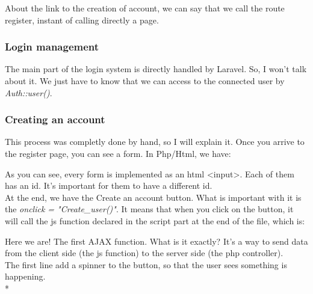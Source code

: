 \documentclass[12pt,a4paper,openany]{book}
\begin{document}
\begin{remarque}
	About the link to the creation of account, we can say that we call the route register, instant of calling directly a page.
\end{remarque}

\subsubsection{Login management}
The main part of the login system is directly handled by Laravel. So, I won't talk about it. We just have to know that we can access to the connected user by \emph{Auth::user()}.

\subsubsection{Creating an account}
This process was completly done by hand, so I will explain it. Once you arrive to the register page, you can see a form. In Php/Html, we have:

\bigskip
As you can see, every form is implemented as an html <input>. Each of them has an id. It's important for them to have a different id.\\

At the end, we have the Create an account button. What is important with it is the \emph{onclick = "Create\_user()"}. It means that when you click on the button, it will call the js function declared in the script part at the end of the file, which is:

\bigskip

Here we are! The first AJAX function. What is it exactly? It's a way to send data from the client side (the js function) to the server side (the php controller).\\


The first line add a spinner to the button, so that the user sees something is happening.\\*
\end{document}
